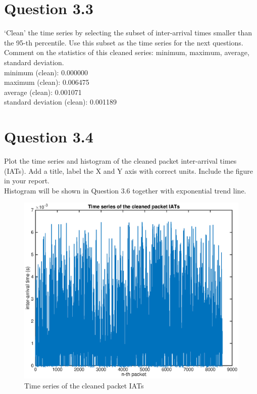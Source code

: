 \documentclass{article}
\newenvironment{homeworkProblem}[1]{
	\section*{#1}
	}{
}
\begin{document}

\begin{homeworkProblem}{Question 3.3}
`Clean' the time series by selecting the subset of inter-arrival times smaller than the 95-th percentile. Use this subset as the time series for the next questions. Comment on the statistics of this cleaned series: minimum, maximum, average, standard deviation.\\

minimum (clean): 0.000000\\
maximum (clean): 0.006475\\
average (clean): 0.001071\\
standard deviation (clean): 0.001189
\end{homeworkProblem}


\begin{homeworkProblem}{Question 3.4}
Plot the time series and histogram of the cleaned packet inter-arrival times (IATs). Add a title, label the X and Y axis with correct units. Include the figure in your report.\\

Histogram will be shown in Question 3.6 together with exponential trend line.

\begin{figure}[H]
\centering
\includegraphics[width=6.6in]{img/time-series1.eps}
\caption{Time series of the cleaned packet IATs}
\end{figure}

\end{homeworkProblem}
\end{document}

